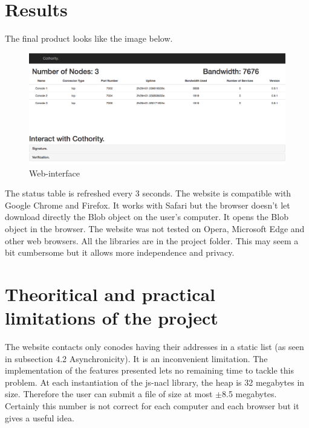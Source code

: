 \documentclass[11pt, a4paper, twoside, openright, openany]{article} %
\begin{document}
\section{Results}
The final product looks like the image below.
\bigbreak

\begin{figure}[ht!]
\centering
\includegraphics[width=125mm]{interface.jpg}
\caption{Web-interface}
\end{figure}

The status table is refreshed every 3 seconds.
\newline
The website is compatible with Google Chrome and Firefox. It works with Safari
but the browser doesn't let download directly the Blob object on the user's computer. It
opens the Blob object in the browser. The website was not tested on Opera, Microsoft Edge and other web browsers.
\newline
All the libraries are in the project folder. This may seem a bit cumbersome but
it allows more independence and privacy.
\newline

\section{Theoritical and practical limitations of the project}
The website contacts only conodes having their addresses in a static list
(as seen in subsection 4.2 Asynchronicity). It is an inconvenient limitation.
The implementation of the features presented lets no remaining time to tackle
this problem.
\newline
At each instantiation of the js-nacl library, the heap is 32 megabytes in size. Therefore
the user can submit a file of size at most \(\pm\)8.5 megabytes. Certainly this number is
not correct for each computer and each browser but it gives a useful idea.
\newline
\end{document}
